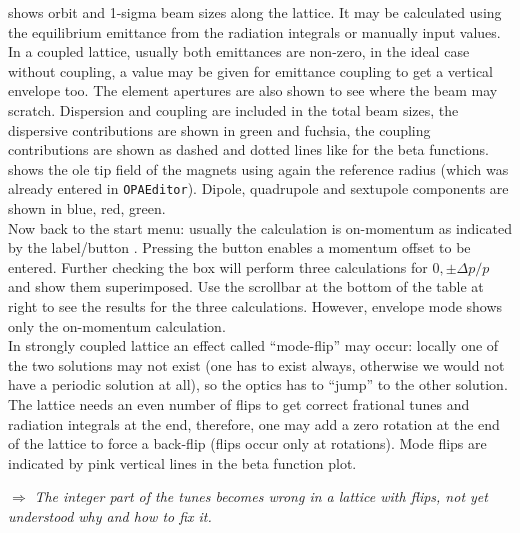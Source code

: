\documentclass[12pt]{article}
\newcommand\todo[1]{$\Longrightarrow$ {\em #1} }
\newcommand\button[1]{\fbox{\small\bf #1}}
\newcommand\chkbox[1]{\fbox{\small $\circ\,$#1}}
\begin{document}
\chkbox{Envelopes} shows orbit and 1-sigma beam sizes along the lattice. It may be calculated using the equilibrium emittance from the radiation integrals or manually input values. In a coupled lattice, usually both emittances are non-zero, in the ideal case without coupling, a value may be given for emittance coupling to get a vertical envelope too.
The element apertures are also shown to see where the beam may scratch. Dispersion and coupling are included in the total beam sizes, the dispersive contributions are shown in green and fuchsia, the coupling contributions are shown as dashed and dotted lines like for the beta functions.
\chkbox{Magnetic field} shows the ole tip field of the magnets using again the reference radius (which was already entered in {\tt OPAEditor}). Dipole, quadrupole and sextupole components are shown in blue, red, green.\\

Now back to the start menu: usually the calculation is on-momentum as indicated by the label/button \button{dp/p[\%]=0}. Pressing the button enables a momentum offset to be entered. Further checking the \chkbox{[-0+]} box will perform three calculations for $0,\pm \Delta p/p$ and show them superimposed. Use the scrollbar at the bottom of the table at right to see the results for the three calculations. 
However, envelope mode shows only the on-momentum calculation.\\

In strongly coupled lattice an effect called ``mode-flip'' may occur: locally one of the two solutions may not exist (one has to exist always, otherwise we would not have a periodic solution at all), so the optics has to ``jump'' to the other solution. The lattice needs an even number of flips to get correct frational tunes and radiation integrals at the end, therefore, one may add a zero rotation at the end of the lattice to force a back-flip (flips occur only at rotations). Mode flips are indicated by pink vertical lines in the beta function plot.

\todo{The integer part of the tunes becomes wrong in a lattice with flips, not yet understood why and how to fix it.}\\
\end{document}
